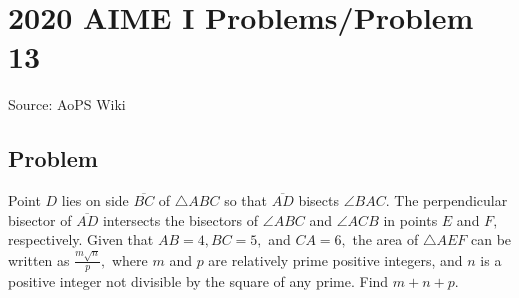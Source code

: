 \documentclass[12pt]{article}
\begin{document}
\section*{{2020 AIME I Problems/Problem 13}}
Source: AoPS Wiki

\subsection*{Problem}
Point $D$ lies on side $\overline{BC}$ of $\triangle ABC$ so that $\overline{AD}$ bisects $\angle BAC.$ The perpendicular bisector of $\overline{AD}$ intersects the bisectors of $\angle ABC$ and $\angle ACB$ in points $E$ and $F,$ respectively. Given that $AB=4,BC=5,$ and $CA=6,$ the area of $\triangle AEF$ can be written as $\tfrac{m\sqrt{n}}p,$ where $m$ and $p$ are relatively prime positive integers, and $n$ is a positive integer not divisible by the square of any prime. Find $m+n+p.$
\end{document}
